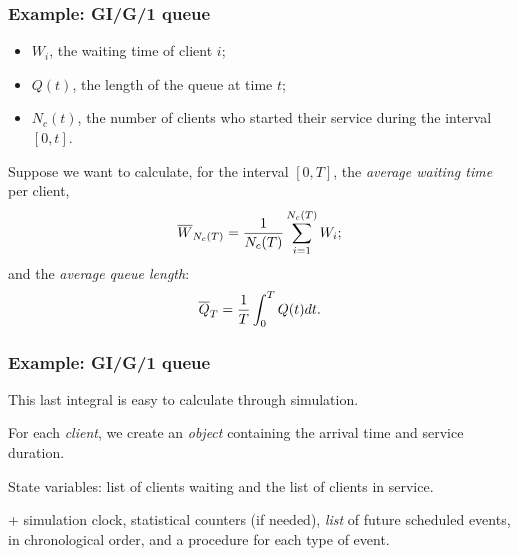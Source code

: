\documentclass[t,usepdftitle=false]{beamer}
\begin{document}
\begin{frame}
	\frametitle{Example: GI/G/1 queue}
	
	\begin{itemize}
		\item ${W_i}$, the waiting time of client $i$;
		\item ${Q(t)}$, the length of the queue at time $t$;
		\item ${N_c(t)}$, the number of clients who started their service during the interval $[0,t]$.
	\end{itemize}
	Suppose we want to calculate, for the interval $[0,T]$, the \emph{average waiting time} per client,
	$${\overline{W}_{N_c(T)}} = {1\over N_c(T)} \sum_{i=1}^{N_c(T)} W_i;$$
	and the \emph{average queue length}:
	$${\overline{Q}_T} = {1\over T} \int_0^T Q(t) dt.$$
	
\end{frame}

\begin{frame}
	\frametitle{Example: GI/G/1 queue}
	
	This last integral is easy to calculate through simulation.
	
	\mbox{}
	
	For each \emph{client}, we create an \emph{object} containing the arrival time and service duration.
	
	\mbox{}
	
	State variables: list of clients waiting and the list of clients in service.
	
	\mbox{}
	
	+ simulation clock, statistical counters (if needed), \emph{list} of future scheduled events, in chronological order, and a procedure for each type of event.
	
\end{frame}
\end{document}

